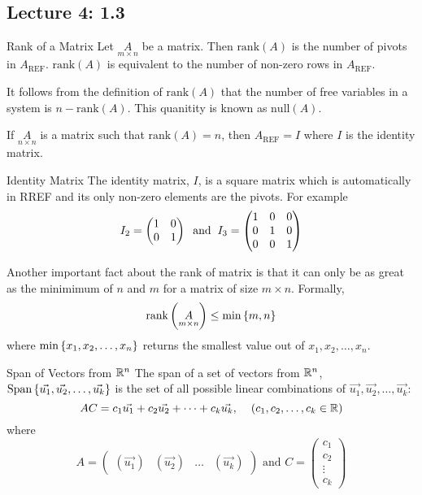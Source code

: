 \subsection{Lecture 4: 1.3}
\begin{defbox}{Rank of a Matrix}{}
    Let $\underset{m \times n}{A}$ be a matrix. Then $\text{rank}(A)$ is the number of pivots in $A_{\text{REF}}$. $\text{rank}(A)$ is equivalent to the number of non-zero rows in $A_{\text{REF}}$. 
\end{defbox}

It follows from the definition of $\text{rank}(A)$ that the number of free variables in a system is $n - \text{rank}(A)$. This quanitity is known as $\text{null}(A)$.

If $\underset{n \times n}{A}$ is a matrix such that $\text{rank}(A) = n$, then $A_{\text{REF}} = I$ where $I$ is the identity matrix.

\begin{defbox}{Identity Matrix}{}
    The identity matrix, $I$, is a square matrix which is automatically in RREF and its only non-zero elements are the pivots. For example
    \[I_2 = \begin{pmatrix}
        1 & 0 \\
        0 & 1
    \end{pmatrix}
    \hspace{0.2cm}
    \text{and}
    \hspace{0.2cm}
    I_3 = \begin{pmatrix}
        1 & 0 & 0 \\
        0 & 1 & 0 \\
        0 & 0 & 1
    \end{pmatrix}\]
\end{defbox}

Another important fact about the rank of matrix is that it can only be as great as the minimimum of $n$ and $m$ for a matrix of size $m \times n$. Formally, 
\[ \text{rank}\left(\underset{m \times n}{A}\right) \leq \min\left\{m, n \right\}\]
where $\min\left\{x_1, x_2, \dots, x_n \right\}$ returns the smallest value out of $x_1, x_2, \dots, x_n$.

\begin{defbox}{Span of Vectors from $\mathbb R^{n}$}{}
    The span of a set of vectors from $\mathbb R^{n}$, $\text{Span}\left\{\vec{u_1}, \vec{u_2}, \dots, \vec{u_k} \right\}$ is the set of all possible linear combinations of $\vec{u_1}, \vec{u_2}, \dots, \vec{u_k}$:
    \[AC = c_1\vec{u_1} + c_2\vec{u_2} + \dots + c_k\vec{u_k}, \hspace{0.4cm}\left(c_1, c_2, \dots, c_k \in \mathbb R \right)\]
    where 
    \[
        A = \begin{pmatrix}
            \left(\vec{u_1}\right) & \left(\vec{u_2}\right) & \dots & \left(\vec{u_k}\right) 
        \end{pmatrix}
        \text{ and } 
        C = \begin{pmatrix}
            c_1 \\ c_2 \\ \vdots \\ c_k 
        \end{pmatrix}
    \]
\end{defbox}

